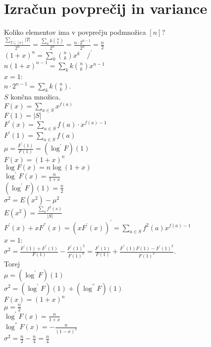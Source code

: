 \documentclass[a4paper, 12pt]{book}
\theoremstyle{definition}
\theoremstyle{remark}
\begin{document}
\section{Izračun povprečij in variance}

Koliko elementov ima v povprečju podmnožica $[n]$? \\
$\frac{\sum_{T \subseteq [n]} |T|}{2^n} = \frac{\sum_n k \binom{n}{k}}{2^n} = \frac{n \cdot 2^{n-1}}{2^n} = \frac{n}{2}$ \\
$(1+x)^n = \sum_k \binom{n}{k} x^k \quad /^{'}$ \\
$n (1+x)^{n-1} = \sum_k k \binom{n}{k} x^{n-1}$ \\
$x=1$: \\
$n \cdot 2^{n-1} = \sum_k k \binom{n}{k}$. \\
$S$ končna množica. \\
$F(x) = \sum_{a \in S} x^{f(a)}$ \\
$F(1) = |S|$ \\
$F^{'}(x) = \sum_{a \in S} f(a) \cdot x^{f(a) - 1}$ \\
$F^{'}(1) = \sum_{a \in S} f(a)$ \\
$\mu = \frac{F^{'}(1)}{F(1)} = (\log^{'} F)(1)$ \\
$F(x) = (1+x)^n$ \\
$\log F(x) = n \log(1+x)$ \\
$\log^{'} F(x) = \frac{n}{1+x}$ \\
$(\log^{'} F)(1) = \frac{n}{2}$ \\
$\sigma^2 = E(x^2) - \mu^2$ \\
$E(x^2) = \frac{\sum_n f^2(s)}{|S|}$ \\
$F^{'}(x) + x F^{''}(x) = (x F^{'}(x))^{'} = \sum_{a \in S} f^2(a) x^{f(a)-1}$ \\
$x=1$: \\
$\sigma^2 = \frac{F^{'}(1) + F^{''}(1)}{F(1)} - \frac{F^{'}(1)^2}{F(1)^2} =
 \frac{F^{'}(1)}{F(1)} + \frac{F^{''}(1) F(1) - F^{'}(1)^2}{F(1)^2}$. \\
Torej \\
$\mu = (\log^{'} F)(1)$ \\
$\sigma^2 = (\log^{'} F)(1) + (\log^{''} F)(1)$ \\
$F(x) = (1+x)^n$ \\
$\mu = \frac{n}{2}$ \\
$\log^{'} F(x) = \frac{n}{1+x}$ \\
$\log^{''} F(x) = -\frac{n}{(1-x)^2}$ \\
$\sigma^2 = \frac{n}{2} - \frac{n}{4} = \frac{n}{4}$ \\
\end{document}
